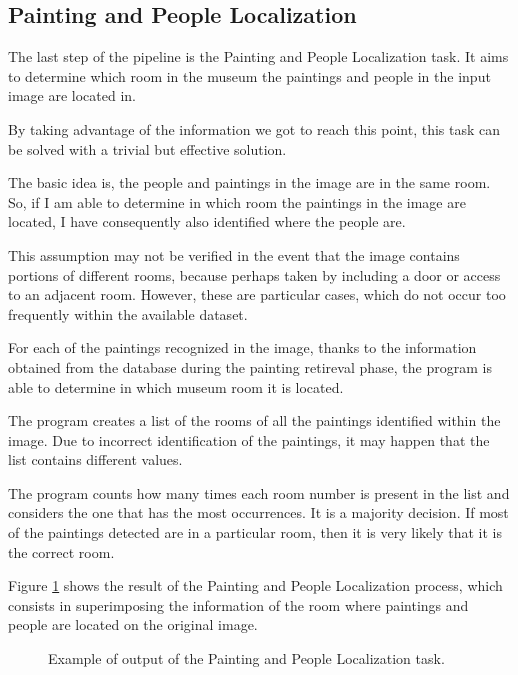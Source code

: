 \documentclass[10pt,twocolumn,letterpaper]{article}
\begin{document}
\subsection{Painting and People Localization}

The last step of the pipeline is the Painting and People Localization task. It aims to determine which room in the museum the paintings and people in the input image are located in.

By taking advantage of the information we got to reach this point, this task can be solved with a trivial but effective solution.

The basic idea is, the people and paintings in the image are in the same room. So, if I am able to determine in which room the paintings in the image are located, I have consequently also identified where the people are.

This assumption may not be verified in the event that the image contains portions of different rooms, because perhaps taken by including a door or access to an adjacent room.
However, these are particular cases, which do not occur too frequently within the available dataset.

For each of the paintings recognized in the image, thanks to the information obtained from the database during the painting retireval phase, the program is able to determine in which museum room it is located.

The program creates a list of the rooms of all the paintings identified within the image. Due to incorrect identification of the paintings, it may happen that the list contains different values.

The program counts how many times each room number is present in the list and considers the one that has the most occurrences. It is a majority decision. If most of the paintings detected are in a particular room, then it is very likely that it is the correct room.

Figure \ref{fig:paintingPeopleLocalization} shows the result of the Painting and People Localization process, which consists in superimposing the information of the room where paintings and people are located on the original image.

\begin{figure}[t]
   \begin{center}
   \fbox{\rule{0pt}{2in} \rule{0.9\linewidth}{0pt}}
   \end{center}
      \caption{Example of output of the Painting and People Localization task.}
   \label{fig:paintingPeopleLocalization}
\end{figure}
\end{document}
